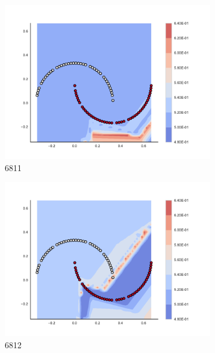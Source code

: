         \begin{figure}[h]\ContinuedFloat
        
\begin{subfigure}[b]{0.09\textwidth}
    \includegraphics[clip, trim=2.35cm 1.75cm 4.5cm 0cm,width=\textwidth]{img/convergence/6811.pdf}
    \caption{6811}
    \label{fig:convergence_6811}
\end{subfigure}
%
\begin{subfigure}[b]{0.09\textwidth}
    \includegraphics[clip, trim=2.35cm 1.75cm 4.5cm 0cm,width=\textwidth]{img/convergence/6812.pdf}
    \caption{6812}
    \label{fig:convergence_6812}
\end{subfigure}
%
\begin{subfigure}[b]{0.09\textwidth}

\end{subfigure}
\end{figure}
